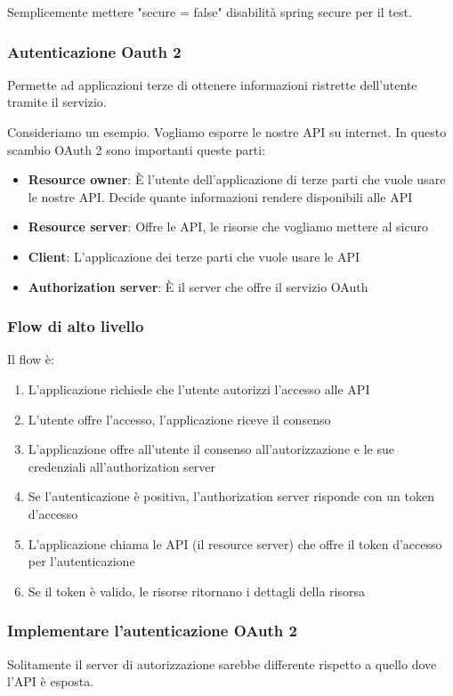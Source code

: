 \documentclass[11pt,a4paper]{book}
\begin{document}
Semplicemente mettere "secure = false" disabilità spring secure per il test.

\subsubsection{Autenticazione Oauth 2}
Permette ad applicazioni terze di ottenere informazioni ristrette dell'utente tramite il servizio.

Consideriamo un esempio. Vogliamo esporre le nostre API su internet. In questo scambio OAuth 2 sono importanti queste parti:
\begin{itemize}
	\item \textbf{Resource owner}: È l'utente dell'applicazione di terze parti che vuole usare le nostre API. Decide quante informazioni rendere disponibili alle API
	\item \textbf{Resource server}: Offre le API, le risorse che vogliamo mettere al sicuro
	\item \textbf{Client}: L'applicazione dei terze parti che vuole usare le API
	\item \textbf{Authorization server}: È il server che offre il servizio OAuth
\end{itemize}

\subsubsection{Flow di alto livello}
Il flow è:
\begin{enumerate}
	\item L'applicazione richiede che l'utente autorizzi l'accesso alle API
	\item L'utente offre l'accesso, l'applicazione riceve il consenso
	\item L'applicazione offre all'utente il consenso all'autorizzazione e le sue credenziali all'authorization server
	\item Se l'autenticazione è positiva, l'authorization server risponde con un token d'accesso
	\item L'applicazione chiama le API (il resource server) che offre il token d'accesso per l'autenticazione
	\item Se il token è valido, le risorse ritornano i dettagli della risorsa
\end{enumerate}

\subsubsection{Implementare l'autenticazione OAuth 2}
Solitamente il server di autorizzazione sarebbe differente rispetto a quello dove l'API è esposta.
\end{document}
